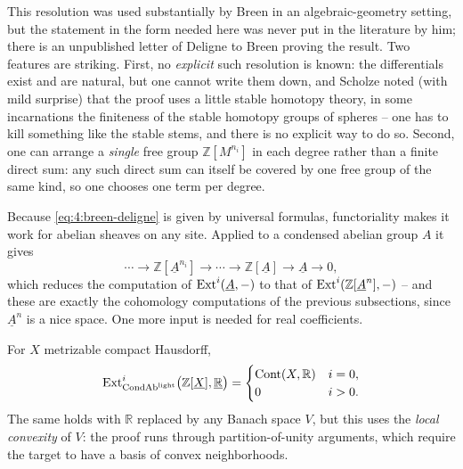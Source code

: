 \begin{remark}
\label{rmk:4:breen-deligne-provenance}
This resolution was used substantially by Breen in an algebraic-geometry setting,
but the statement in the form needed here was never put in the literature by him;
there is an unpublished letter of Deligne to Breen proving the result. Two
features are striking. First, no \emph{explicit} such resolution is known: the
differentials exist and are natural, but one cannot write them down, and Scholze
noted (with mild surprise) that the proof uses a little stable homotopy theory,
in some incarnations the finiteness of the stable homotopy groups of spheres --
one has to kill something like the stable stems, and there is no explicit way to
do so. Second, one can arrange a \emph{single} free group $\mathbb{Z}[M^{n_i}]$
in each degree rather than a finite direct sum: any such direct sum can itself be
covered by one free group of the same kind, so one chooses one term per degree.
\end{remark}

Because \eqref{eq:4:breen-deligne} is given by universal formulas, functoriality
makes it work for abelian sheaves on any site. Applied to a condensed abelian
group $A$ it gives
\begin{equation}
\label{eq:4:breen-deligne-A}
\cdots\to\mathbb{Z}[\underline{A}^{n_i}]\to\cdots\to\mathbb{Z}[\underline{A}]\to
\underline{A}\to0,
\end{equation}
which reduces the computation of $\operatorname{Ext}^{i}(\underline{A},-)$ to that of
$\operatorname{Ext}^{i}(\mathbb{Z}[\underline{A}^{n}],-)$ -- and these are exactly the
cohomology computations of the previous subsections, since $\underline{A}^{n}$ is
a nice space. One more input is needed for real coefficients.

\begin{proposition}
\label{prop:4:real-coefficients}
For $X$ metrizable compact Hausdorff,
\begin{equation}
\label{eq:4:real-coefficients}
\operatorname{Ext}^{i}_{\mathrm{CondAb}^{\mathrm{light}}}\bigl(\mathbb{Z}[\underline{X}],\underline{\mathbb{R}}\bigr)=
\begin{cases}
\operatorname{Cont}(X,\mathbb{R}) & i=0,\\
0 & i>0.
\end{cases}
\end{equation}
The same holds with $\mathbb{R}$ replaced by any Banach space $V$, but this uses
the \emph{local convexity} of $V$: the proof runs through partition-of-unity
arguments, which require the target to have a basis of convex neighborhoods.
\end{proposition}

